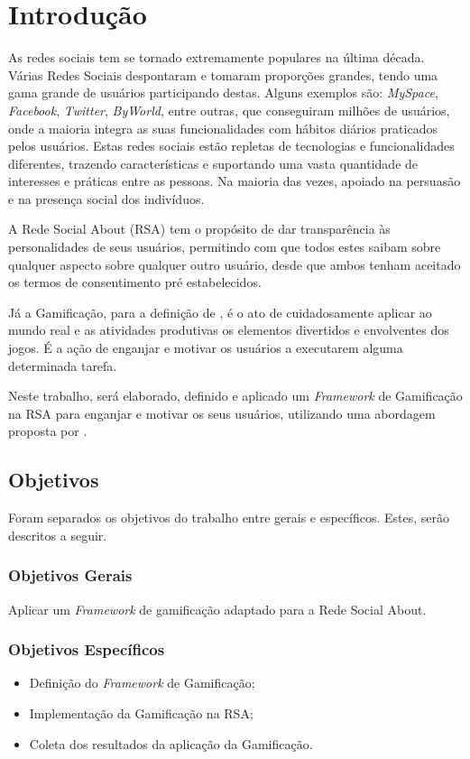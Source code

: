 \chapter[Introdução]{Introdução}
As redes sociais tem se tornado extremamente populares na última década.
Várias
Redes Sociais despontaram e tomaram proporções grandes, tendo uma gama grande
de usuários participando destas. Alguns exemplos são: \textit{MySpace}, \textit{Facebook}, \textit{Twitter},
\textit{ByWorld}, entre outras, que conseguiram milhões de usuários, onde a maioria integra
as suas funcionalidades com hábitos diários praticados pelos usuários.
Estas redes sociais estão repletas de tecnologias e funcionalidades diferentes,
trazendo características e suportando uma vasta quantidade de interesses e práticas
entre as pessoas. Na maioria das vezes, apoiado na persuasão e na presença social
dos indivíduos.

A Rede Social About (RSA) tem o propósito de dar transparência às personalidades de seus usuários, permitindo com que todos
estes saibam sobre qualquer aspecto sobre qualquer outro usuário, desde que ambos tenham aceitado os
termos de consentimento pré estabelecidos.

Já a Gamificação, para a definição de \cite{chou2015actionable},  é o ato de cuidadosamente aplicar ao mundo
real e as atividades produtivas os elementos divertidos e envolventes dos jogos.
É a ação de enganjar e motivar os usuários a executarem alguma determinada
tarefa. 

Neste trabalho, será elaborado, definido e aplicado um \textit{Framework} de Gamificação na RSA 
para enganjar e motivar os seus usuários, utilizando uma abordagem proposta por \cite{chou2015actionable}.


\section{Objetivos}
Foram separados os objetivos do trabalho entre gerais e específicos. Estes, serão
descritos a seguir.
\subsection{Objetivos Gerais}
Aplicar um \textit{Framework} de  gamificação adaptado para a Rede Social About.
\subsection{Objetivos Específicos}
\begin{itemize}
    \item Definição do \textit{Framework} de Gamificação;
    \item Implementação da Gamificação na RSA;
    \item Coleta dos resultados da aplicação da Gamificação.
\end{itemize}
